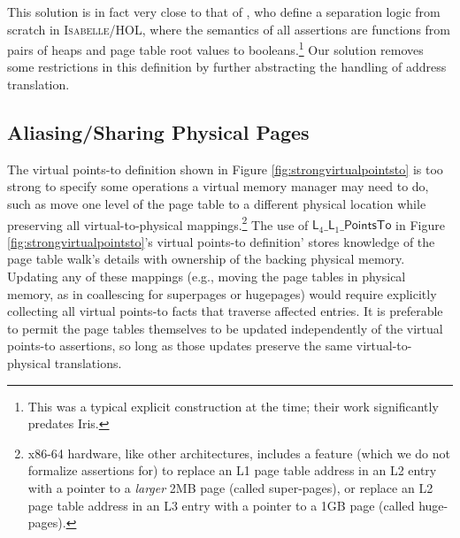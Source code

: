 This solution is in fact very close to that of \citet{kolanski08vstte}, who define a separation logic from scratch in \textsc{Isabelle/HOL},
where the semantics of all assertions are functions from pairs of heaps and page table root values to booleans.\footnote{
  This was a typical explicit construction at the time; their work significantly predates Iris.
}
Our solution removes some restrictions in this definition by further abstracting the handling of address translation.

\subsection{Aliasing/Sharing Physical Pages}
  \label{sec:sharingpages}  
  The virtual points-to definition shown in Figure \ref{fig:strongvirtualpointsto} 
  is too strong to specify some operations a virtual memory manager may need to do, such as
  move one level of the page table to a different physical location while preserving all virtual-to-physical mappings.\footnote{
    x86-64 hardware, like other architectures, includes a feature (which we do not formalize assertions for) to
    replace an L1 page table address in an L2 entry with a pointer to a \emph{larger} 2MB page (called super-pages), 
    or replace an L2 page table address in an L3 entry with a pointer to a 1GB page (called huge-pages).
  }
  The use of $\textsf{L}_{4}\_\textsf{L}_{1}\_\textsf{PointsTo}$ in Figure \ref{fig:strongvirtualpointsto}'s
  virtual points-to definition'
   stores knowledge of the page table walk's details with ownership of the backing physical
  memory.
  Updating any of these mappings (e.g., moving the page tables in physical memory, as in coallescing for
  superpages or hugepages)
  would require explicitly collecting all virtual points-to facts that traverse affected entries.
  It is preferable to permit the page tables themselves to be updated independently of the virtual points-to assertions,
  so long as those updates preserve the same virtual-to-physical translations.

  \newcommand{\ghostmaptoken}[3]{\ensuremath{#2\hookrightarrow^{#1}#3}}
  \newcommand{\fracghostmaptoken}[4]{\ensuremath{#2\hookrightarrow^{#1}_{#4}#3}}

